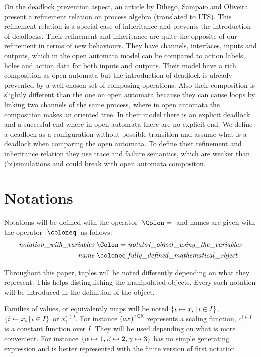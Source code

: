 \documentclass{article}
\begin{document}
On the deadlock prevention aspect, an article by Dihego, Sampaio and Oliveira \cite{DIHEGO2020110598} present a refinement relation on process algebra (translated to LTS).
This refinement relation is a special case of inheritance and prevents the introduction of deadlocks.
Their refinement and inheritance are quite the opposite of our refinement in terms of new behaviours.
They have channels, interfaces, inputs and outputs, which in the open automata model can be compared to action labels, holes and action data for both inputs and outputs.
Their model have a rich composition as open automata but the introduction of deadlock is already prevented by a well chosen set of composing operations.
Also their composition is slightly different than the one on open automata because they can cause loops by linking two channels of the same process, where in open automata the composition makes an oriented tree.
In their model there is an explicit deadlock and a succesful end where in open automata there are no explicit end.
We define a deadlock as a configuration without possible transition and assume what is a deadlock when comparing the open automata.
To define their refinement and inheritance relation they use trace and failure semantics, which are weaker than (bi)simulations \cite{10.5555/640428.640430} and could break with open automata compositon.


\section{Notations}\label{sec:notations}
Notations will be defined with the operator \(\defnotation\) and names are given with the operator \(\defobject\) as follows:
\begin{align*}
	\mathit{notation\_with\_variables} & \defnotation \mathit{notated\_object\_using\_the\_variables} \\
	\mathit{name} & \defobject \mathit{fully\_defined\_mathematical\_object}
\end{align*}

Throughout this paper, tuples will be noted differently depending on what they represent.
This helps distinguishing the manipulated objects.
Every such notation will be introduced in the definition of the object.

Families of values, or equivalently maps will be noted \({\left\{i \mapsto x_i\,\middle|\, i \in I\right\}}\), \({\left\{i \gets x_i\,\middle|\, i \in I\right\}}\) or \(x_i^{i \in I}\).
For instance \({\left(ax\right)}^{x \in \mathbb{R}}\) represents a scaling function, \(c^{i \in I}\) is a constant function over \(I\).
They will be used depending on what is more convenient.
For instance \({\left\{\alpha \mapsto 1, \beta \mapsto 2, \gamma \mapsto 3\right\}}\) has no simple generating expression and is better represented with the finite version of first notation.
\end{document}
